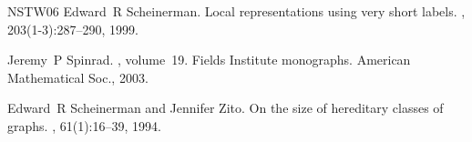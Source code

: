 \documentclass[letterpaper,11pt]{article}
\theoremstyle{definition}
\theoremstyle{remark}
\begin{document}
\begin{thebibliography}{NSTW06}
Edward~R Scheinerman.
\newblock Local representations using very short labels.
, 203(1-3):287--290, 1999.

Jeremy~P Spinrad.
, volume~19.
\newblock Fields Institute monographs. American Mathematical Soc., 2003.

Edward~R Scheinerman and Jennifer Zito.
\newblock On the size of hereditary classes of graphs.
, 61(1):16--39, 1994.

\end{thebibliography}

	
\end{document}
